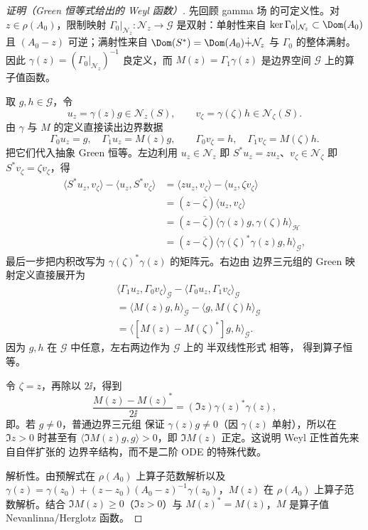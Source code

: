 \begin{proof}[证明（Green 恒等式给出的 Weyl 函数）]
先回顾 gamma 场 的可定义性。对 $z\in\rho(A_0)$，限制映射
$\Gamma_0|_{\mathcal N_z}:\mathcal N_z\to\mathcal G$ 是双射：单射性来自
$\ker\Gamma_0|_{\mathcal N_z}\subset\Dom(A_0)$ 且 $(A_0-z)$ 可逆；满射性来自
$\Dom(S^*)=\Dom(A_0)\dot+\mathcal N_z$ 与 $\Gamma_0$ 的整体满射。因此
$\gamma(z)=(\Gamma_0|_{\mathcal N_z})^{-1}$ 良定义，而
$M(z)=\Gamma_1\gamma(z)$ 是边界空间 $\mathcal G$ 上的算子值函数。

取 $g,h\in\mathcal G$，令
\[
 u_z=\gamma(z)g\in\mathcal N_z(S),
 \qquad
 v_\zeta=\gamma(\zeta)h\in\mathcal N_\zeta(S).
\]
由 $\gamma$ 与 $M$ 的定义直接读出边界数据
\[
 \Gamma_0u_z=g,
 \quad
 \Gamma_1u_z=M(z)g,
 \qquad
 \Gamma_0v_\zeta=h,
 \quad
 \Gamma_1v_\zeta=M(\zeta)h.
\]
把它们代入抽象 Green 恒等。左边利用
$u_z\in\mathcal N_z$ 即 $S^*u_z=zu_z$、$v_\zeta\in\mathcal N_\zeta$ 即
$S^*v_\zeta=\zeta v_\zeta$，得
\begin{align*}
 \langle S^*u_z,v_\zeta\rangle
 -\langle u_z,S^*v_\zeta\rangle
 &=\langle zu_z,v_\zeta\rangle-\langle u_z,\zeta v_\zeta\rangle\\
 &=(z-\overline\zeta)\langle u_z,v_\zeta\rangle\\
 &=(z-\overline\zeta)
 \langle\gamma(z)g,\gamma(\zeta)h\rangle_{\mathcal H}\\
 &=(z-\overline\zeta)
 \langle\gamma(\zeta)^*\gamma(z)g,h\rangle_{\mathcal G},
\end{align*}
最后一步把内积改写为 $\gamma(\zeta)^*\gamma(z)$ 的矩阵元。右边由 边界三元组的
Green 映射定义直接展开为
\begin{align*}
 &\langle\Gamma_1u_z,\Gamma_0v_\zeta\rangle_{\mathcal G}
 -\langle\Gamma_0u_z,\Gamma_1v_\zeta\rangle_{\mathcal G}\\
 &=\langle M(z)g,h\rangle_{\mathcal G}
 -\langle g,M(\zeta)h\rangle_{\mathcal G}\\
 &=\langle [M(z)-M(\zeta)^*]g,h\rangle_{\mathcal G}.
\end{align*}
因为 $g,h$ 在 $\mathcal G$ 中任意，左右两边作为 $\mathcal G$ 上的 半双线性形式 相等，
得到算子恒等。

令 $\zeta=z$，再除以 $2\ii$，得到
\[
 \frac{M(z)-M(z)^*}{2\ii}
 =(\Im z)\gamma(z)^*\gamma(z),
\]
即。若 $g\ne0$，普通边界三元组
保证 $\gamma(z)g\ne0$（因 $\gamma(z)$ 单射），所以在 $\Im z>0$ 时甚至有
$\langle\Im M(z)g,g\rangle>0$，即 $\Im M(z)$ 正定。这说明 Weyl 正性首先来自自伴扩张的
边界辛结构，而不是二阶 ODE 的特殊代数。

解析性。由预解式在 $\rho(A_0)$ 上算子范数解析以及
$\gamma(z)=\gamma(z_0)+(z-z_0)(A_0-z)^{-1}\gamma(z_0)$，$M(z)$ 在
$\rho(A_0)$ 上算子范数解析。结合 $\Im M(z)\ge0$（$\Im z>0$）与
$M(z)^*=M(\overline z)$，$M$ 是算子值 Nevanlinna/Herglotz 函数。
\end{proof}


